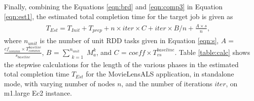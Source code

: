 \documentclass[conference]{IEEEtran}
\begin{document}
Finally, combining the Equations \ref{eqn:brd} and \ref{eqn:comp3} in  Equation \ref{eqn:est1}, the estimated total
completion time for the target job is given as
\begin{align}\label{eqn:est2}
\begin{split}
 \mathit{T_{\mathit{Est}}}  =   \mathit{T_{\mathit{Init}}}  +    \mathit{T_{\mathit{prep}}} + n \times \mathit{iter} \times C  +   \mathit{iter} \times  B / n + \frac{A \times s}{n},
\end{split}
 \end{align} where $\mathit{n_{unit}}$ is the number of unit RDD tasks given in Equation \ref{eqn:s},
 $A$ = $\mathit{\frac{\mathit{cf}_{\mathit{commn}} \times T_{\mathit{commn}}^{\mathit{baseline}}}{\mathit{s_{\mathit{baseline}}}}}$,
$B$ = $\sum_{\substack{k=1}}^{\mathit{n_{unit}}}
                                                                    \mathit{M_{a}^{k}}$, and $C$ = $\mathit{coeff} \times \mathit{T_{\mathit{vs}}^{\mathit{baseline}}}$. Table \ref{table:calc} shows the stepwise calculations for the length of the various phases in the estimated total
  completion time $\mathit{T_{\mathit{Est}}}$ for the MovieLensALS application, in standalone mode, with varying number of nodes $n$, and the number of iterations $\mathit{iter}$, on m1.large Ec2 instance.
\end{document}
